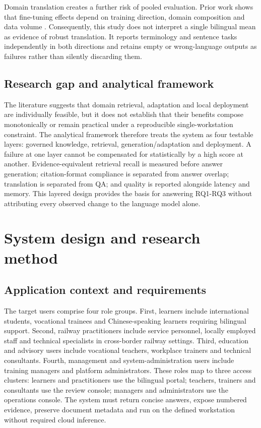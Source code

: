 Domain translation creates a further risk of pooled evaluation. Prior work shows that fine-tuning effects depend on training direction, domain composition and data volume \citep{hu2024translation,vieira2024translation,zheng2024translation}. Consequently, this study does not interpret a single bilingual mean as evidence of robust translation. It reports terminology and sentence tasks independently in both directions and retains empty or wrong-language outputs as failures rather than silently discarding them.

\subsection{Research gap and analytical framework}

The literature suggests that domain retrieval, adaptation and local deployment are individually feasible, but it does not establish that their benefits compose monotonically or remain practical under a reproducible single-workstation constraint. The analytical framework therefore treats the system as four testable layers: governed knowledge, retrieval, generation/adaptation and deployment. A failure at one layer cannot be compensated for statistically by a high score at another. Evidence-equivalent retrieval recall is measured before answer generation; citation-format compliance is separated from answer overlap; translation is separated from QA; and quality is reported alongside latency and memory. This layered design provides the basis for answering RQ1-RQ3 without attributing every observed change to the language model alone.

\section{System design and research method}

\subsection{Application context and requirements}

The target users comprise four role groups. First, learners include international students, vocational trainees and Chinese-speaking learners requiring bilingual support. Second, railway practitioners include service personnel, locally employed staff and technical specialists in cross-border railway settings. Third, education and advisory users include vocational teachers, workplace trainers and technical consultants. Fourth, management and system-administration users include training managers and platform administrators. These roles map to three access clusters: learners and practitioners use the bilingual portal; teachers, trainers and consultants use the review console; managers and administrators use the operations console. The system must return concise answers, expose numbered evidence, preserve document metadata and run on the defined workstation without required cloud inference.


